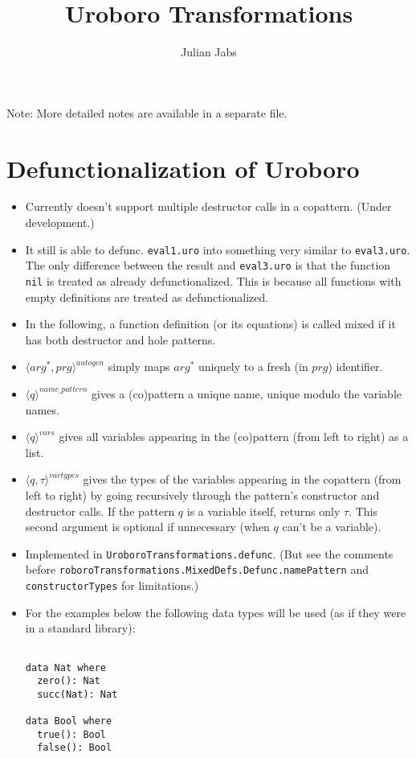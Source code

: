\documentclass[11pt]{article} %
\title{Uroboro Transformations}
\author{Julian Jabs}
\begin{document}
\maketitle

Note: More detailed notes are available in a separate file.

\section{Defunctionalization of Uroboro}

\begin{itemize}
\item Currently doesn't support multiple destructor calls in a copattern. (Under development.)

\item It still is able to defunc. \texttt{eval1.uro} into something very similar to \texttt{eval3.uro}. The only difference between the result and \texttt{eval3.uro} is that the function \texttt{nil} is treated as already defunctionalized. This is because all functions with empty definitions are treated as defunctionalized.

\item In the following, a function definition (or its equations) is called mixed if it has both destructor and hole patterns.

\item $\langle arg^*, prg \rangle^{autogen}$ simply maps $arg^*$ uniquely to a fresh (in $prg$) identifier.

\item $\langle q \rangle^{name\_pattern}$ gives a (co)pattern a unique name, unique modulo the variable names.

\item $\langle q \rangle^{vars}$ gives all variables appearing in the (co)pattern (from left to right) as a list.

\item $\langle q, \tau \rangle^{vartypes}$ gives the types of the variables appearing in the copattern (from left to right) by going recursively through the pattern's constructor and destructor calls. If the pattern $q$ is a variable itself, returns only $\tau$. This second argument is optional if unnecessary (when $q$ can't be a variable).

\item Implemented in \texttt{UroboroTransformations.defunc}. (But see the comments before \texttt{roboroTransformations.MixedDefs.Defunc.namePattern} and \texttt{constructorTypes} for limitations.)

\item For the examples below the following data types will be used (as if they were in a standard library):
\begin{lstlisting}

data Nat where
  zero(): Nat
  succ(Nat): Nat

data Bool where
  true(): Bool
  false(): Bool

\end{lstlisting}
\end{itemize}
\end{document}
